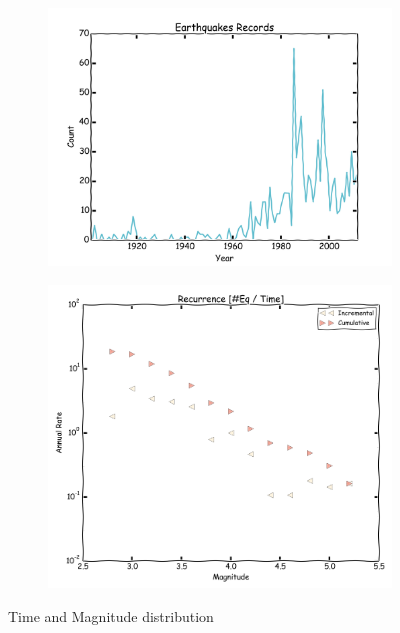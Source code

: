 \documentclass[final]{beamer}
\begin{document}
\begin{poster}
\begin{figure}[H]
	\centering
	\begin{subfigure}[T]{0.52\textwidth}
	  	\centering
		\includegraphics[width=1.0\textwidth]{hmtk_bsb2013_rate}
		\label{fig:sa_eq_record}
	\end{subfigure}
	\begin{subfigure}[T]{0.45\textwidth}
	  	\centering
		\includegraphics[width=1.0\textwidth]{occurrence}
		\label{fig:br_eq_record}
    \end{subfigure}%
	\caption{Time and Magnitude distribution}
	\label{fig:eq_record}
\end{figure}




\end{poster}
\end{document}
